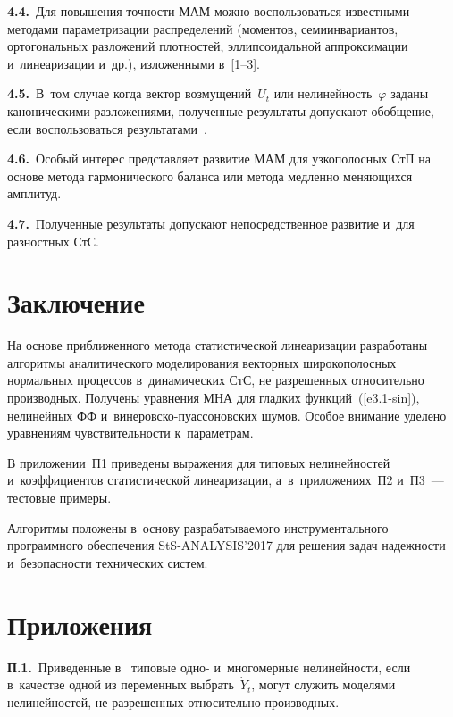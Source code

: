 \begin{multicols}{2}

\noindent
\textbf{4.4.}\ Для повышения точности МАМ можно воспользоваться известными методами 
параметризации распределений (моментов, семиинвариантов, ортогональных разложений 
плотностей, эллипсоидальной аппроксимации и~линеаризации и~др.), изложенными 
в~[1--3].

\noindent
\textbf{4.5.}\ В~том случае когда вектор возмущений~$U_t$ или нелинейность~$\varphi$ 
заданы каноническими разложениями, полученные результаты допускают обобщение, 
если воспользоваться результатами~\cite{2-sin, 3-sin}.

\noindent
\textbf{4.6.}\ Особый интерес представляет развитие МАМ для узкополосных СтП на 
основе метода гармонического баланса или метода медленно меняющихся амплитуд.

\noindent
\textbf{4.7.}\ Полученные результаты допускают непосредственное развитие и~для 
разностных СтС.

\section{Заключение}

На основе приближенного метода статистической линеаризации разработаны 
алгоритмы аналитического моделирования векторных широкополосных нормальных 
процессов в~динамических СтС, не разрешенных относительно 
производных. Получены уравнения МНА для гладких функций~(\ref{e3.1-sin}), 
нелинейных ФФ и~ви\-не\-ров\-ско-пуас\-со\-нов\-ских шумов. Особое внимание 
уделено уравнениям чувствительности к~па\-ра\-метрам.

В приложении~П1 приведены выражения для типовых нелинейностей и~коэффициентов 
статистической линеаризации, а~в~приложениях~П2 и~П3~--- тестовые примеры.

Алгоритмы положены в~основу разрабатываемого инструментального программного 
обеспечения StS-ANALYSIS'2017 для решения задач надежности и~безопасности 
технических систем.



{\small \section*{\raggedleft Приложения}




\noindent
\textbf{П.1.}\ Приведенные в~\cite{4-sin} типовые одно- и~многомерные нелинейности, если 
в~качестве  одной из переменных выбрать~$\dot Y_t$, могут служить моделями 
нелинейностей, не разрешенных относительно производных.

}
\end{multicols}
